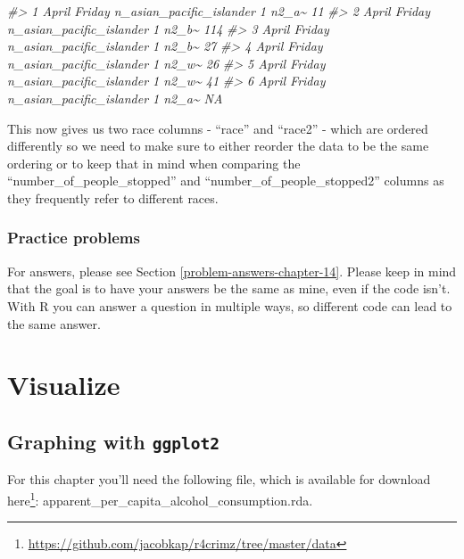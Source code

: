 \documentclass[
]{krantz}
\makeatletter
\newenvironment{Shaded}{\begin{snugshade}}{\end{snugshade}}
\newcommand{\CommentTok}[1]{\textcolor[rgb]{0.37,0.37,0.37}{\textit{#1}}}
\renewcommand{\href}[2]{#2\footnote{\url{#1}}}
\newenvironment{kframe}{%
\medskip{}
\setlength{\fboxsep}{.8em}
 \def\at@end@of@kframe{}%
 \ifinner\ifhmode%
  \def\at@end@of@kframe{\end{minipage}}%
  \begin{minipage}{\columnwidth}%
 \fi\fi%
 \def\FrameCommand##1{\hskip\@totalleftmargin \hskip-\fboxsep
 \colorbox{shadecolor}{##1}\hskip-\fboxsep
     \hskip-\linewidth \hskip-\@totalleftmargin \hskip\columnwidth}%
 \MakeFramed {\advance\hsize-\width
   \@totalleftmargin\z@ \linewidth\hsize
   \@setminipage}}%
 {\par\unskip\endMakeFramed%
 \at@end@of@kframe}
\renewenvironment{Shaded}{\begin{kframe}}{\end{kframe}}
\makeatother
\begin{document}
\begin{Shaded}
\begin{Highlighting}[]
\CommentTok{\#\textgreater{} 1 April  Friday n\_asian\_pacific\_islander                1 n2\_a\textasciitilde{}               11}
\CommentTok{\#\textgreater{} 2 April  Friday n\_asian\_pacific\_islander                1 n2\_b\textasciitilde{}              114}
\CommentTok{\#\textgreater{} 3 April  Friday n\_asian\_pacific\_islander                1 n2\_b\textasciitilde{}               27}
\CommentTok{\#\textgreater{} 4 April  Friday n\_asian\_pacific\_islander                1 n2\_w\textasciitilde{}               26}
\CommentTok{\#\textgreater{} 5 April  Friday n\_asian\_pacific\_islander                1 n2\_w\textasciitilde{}               41}
\CommentTok{\#\textgreater{} 6 April  Friday n\_asian\_pacific\_islander                1 n2\_a\textasciitilde{}               NA}
\end{Highlighting}
\end{Shaded}

This now gives us two race columns - ``race'' and ``race2'' - which are ordered differently so we need to make sure to either reorder the data to be the same ordering or to keep that in mind when comparing the ``number\_of\_people\_stopped'' and ``number\_of\_people\_stopped2'' columns as they frequently refer to different races.

\hypertarget{practice-problems-7}{%
\section{Practice problems}\label{practice-problems-7}}

For answers, please see Section \ref{problem-answers-chapter-14}. Please keep in mind that the goal is to have your answers be the same as mine, even if the code isn't. With R you can answer a question in multiple ways, so different code can lead to the same answer.

\hypertarget{part-visualize}{%
\part{Visualize}\label{part-visualize}}

\hypertarget{graphing-intro}{%
\chapter{\texorpdfstring{Graphing with \texttt{ggplot2}}{Graphing with ggplot2}}\label{graphing-intro}}

For this chapter you'll need the following file, which is available for download \href{https://github.com/jacobkap/r4crimz/tree/master/data}{here}: apparent\_per\_capita\_alcohol\_consumption.rda.
\end{document}
